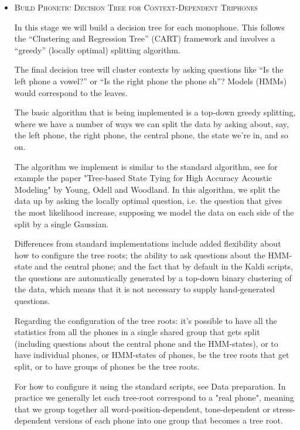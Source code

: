 \documentclass[10pt,a4paper]{article}
\begin{document}
\begin{itemize}

\item \textsc{Build Phonetic Decision Tree for Context-Dependent Triphones}

  In this stage we will build a decision tree for each monophone. This follows the “Clustering and Regression Tree” (CART) framework and involves a “greedy” (locally optimal) splitting algorithm.

  The final decision tree will cluster contexts by asking questions like “Is the left phone a vowel?” or “Is the right phone the phone sh”? Models (HMMs) would correspond to the leaves.

  The basic algorithm that is being implemented is a top-down greedy splitting, where we have a number of ways we can split the data by asking about, say, the left phone, the right phone, the central phone, the state we're in, and so on. 

The algorithm we implement is similar to the standard algorithm, see for example the paper "Tree-based State Tying for High Accuracy Acoustic Modeling" by Young, Odell and Woodland. In this algorithm, we split the data up by asking the locally optimal question, i.e. the question that gives the most likelihood increase, supposing we model the data on each side of the split by a single Gaussian. 

Differences from standard implementations include added flexibility about how to configure the tree roots; the ability to ask questions about the HMM-state and the central phone; and the fact that by default in the Kaldi scripts, the questions are automatically generated by a top-down binary clustering of the data, which means that it is not necessary to supply hand-generated questions. 

Regarding the configuration of the tree roots: it's possible to have all the statistics from all the phones in a single shared group that gets split (including questions about the central phone and the HMM-states), or to have individual phones, or HMM-states of phones, be the tree roots that get split, or to have groups of phones be the tree roots. 

For how to configure it using the standard scripts, see Data preparation. In practice we generally let each tree-root correspond to a "real phone", meaning that we group together all word-position-dependent, tone-dependent or stress-dependent versions of each phone into one group that becomes a tree root.


\end{itemize}
\end{document}

